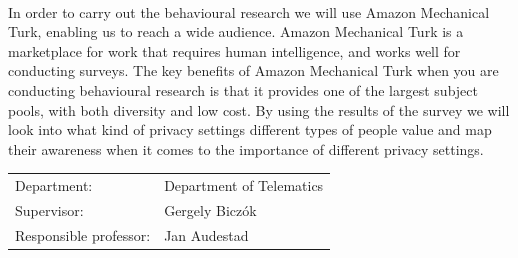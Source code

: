 \documentclass[a4paper,11pt]{article}
\begin{document}
\begin{titlepage}
\paragraph{}
In order to carry out the behavioural research we will use Amazon Mechanical Turk, enabling us to reach a wide audience. Amazon Mechanical Turk is a marketplace for work that requires human intelligence, and works well for conducting surveys.
The key benefits of Amazon Mechanical Turk when you are conducting behavioural research is that it provides one of the largest subject pools, with both diversity and low cost. By using the results of the survey we will look into what kind of privacy settings different types of people value and map their awareness when it comes to the importance of different privacy settings. 


\vspace{0.2cm}
\begin{tabular}{@{}p{5cm}l}
Department:		& Department of Telematics \\
Supervisor:		& Gergely Biczók \\
Responsible professor: 	& Jan Audestad \\
\end{tabular}

\end{titlepage}
\end{document}
